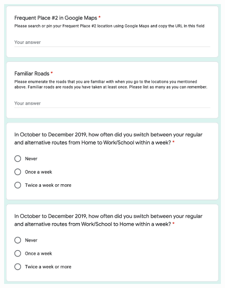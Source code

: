 \begin{figure}[h]
  \centering
  \includegraphics[scale=0.6]{figures/d-travel3.png}
\end{figure}
\clearpage

